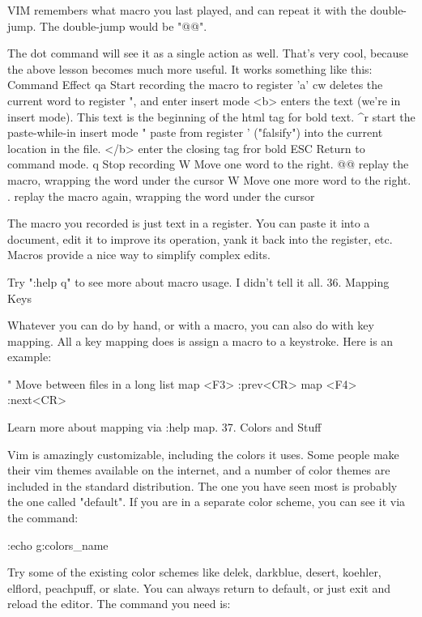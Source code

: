 \documentclass[a4paper, 12pt]{article}
\begin{document}
      VIM remembers what macro you last played, and can repeat it with the double-jump. The double-jump would be "@@".

      The dot command will see it as a single action as well. That's very cool, because the above lesson becomes much more useful. It works something like this:
      Command	Effect
      qa	Start recording the macro to register 'a'
      cw	deletes the current word to register ", and enter insert mode
      <b>	enters the text (we're in insert mode). This text is the beginning of the html tag for bold text.
      ^r	start the paste-while-in insert mode
      "	paste from register ' ("falsify") into the current location in the file.
      </b>	enter the closing tag fror bold
      ESC	Return to command mode.
      q	Stop recording
      W	Move one word to the right.
      @@	replay the macro, wrapping the word under the cursor
      W	Move one more word to the right.
      .	replay the macro again, wrapping the word under the cursor

      The macro you recorded is just text in a register. You can paste it into a document, edit it to improve its operation, yank it back into the register, etc. Macros provide a nice way to simplify complex edits.

      Try ":help q" to see more about macro usage. I didn't tell it all.
  36. Mapping Keys

      Whatever you can do by hand, or with a macro, you can also do with key mapping. All a key mapping does is assign a macro to a keystroke. Here is an example:

                  " Move between files in a long list
                  map <F3> :prev<CR>
                  map <F4> :next<CR>
              

      Learn more about mapping via :help map.
  37. Colors and Stuff

      Vim is amazingly customizable, including the colors it uses. Some people make their vim themes available on the internet, and a number of color themes are included in the standard distribution. The one you have seen most is probably the one called "default". If you are in a separate color scheme, you can see it via the command:

          :echo g:colors_name

      Try some of the existing color schemes like delek, darkblue, desert, koehler, elflord, peachpuff, or slate. You can always return to default, or just exit and reload the editor. The command you need is:
\end{document}
